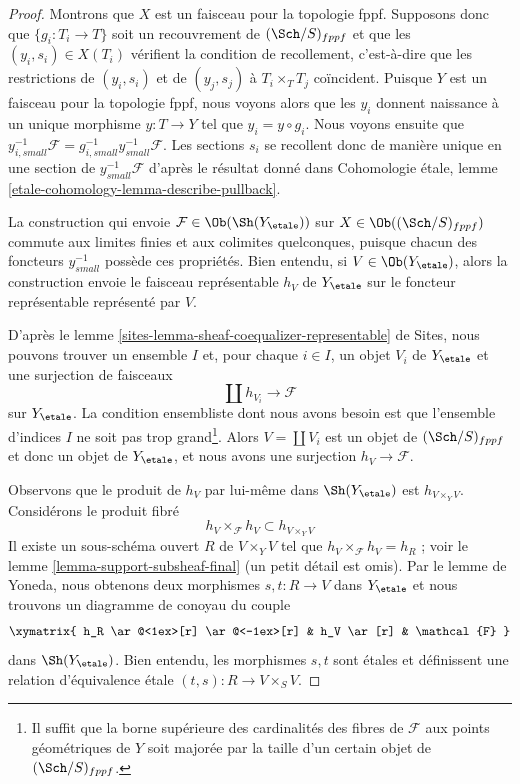 \begin{proof}
Montrons que $X$ est un faisceau pour la topologie fppf. Supposons donc
que $\{g_i : T_i \to T\}$ soit un recouvrement de $(\Sch/S)_{fppf}$ et que
les $(y_i, s_i) \in X(T_i)$ vérifient la condition de recollement, c'est-à-dire que les
restrictions de $(y_i, s_i)$ et de $(y_j, s_j)$ à $T_i \times_T T_j$ coïncident.
Puisque $Y$ est un faisceau pour la topologie fppf, nous voyons alors que
les $y_i$ donnent naissance à un unique morphisme $y : T \to Y$ tel que
$y_i = y \circ g_i$. Nous voyons ensuite que
$y_{i, small}^{-1}\mathcal{F} = g_{i, small}^{-1}y_{small}^{-1}\mathcal{F}$.
Les sections $s_i$ se recollent donc de manière unique en une section de
$y_{small}^{-1}\mathcal{F}$ d'après le résultat donné dans
Cohomologie \'etale, lemme \ref{etale-cohomology-lemma-describe-pullback}.

\medskip\noindent
La construction qui envoie $\mathcal{F} \in \Ob(\Sh(Y_\etale))$
sur $X \in \Ob((\Sch/S)_{fppf})$ commute aux limites finies et
aux colimites quelconques, puisque chacun des foncteurs $y_{small}^{-1}$ possède
ces propriétés. Bien entendu, si $V \in \Ob(Y_\etale)$, alors
la construction envoie le faisceau représentable $h_V$ de $Y_\etale$
sur le foncteur représentable représenté par $V$.

\medskip\noindent
D'après le lemme \ref{sites-lemma-sheaf-coequalizer-representable} de Sites,
nous pouvons trouver un ensemble $I$ et, pour chaque $i \in I$, un objet $V_i$ de $Y_\etale$
et une surjection de faisceaux
$$
\coprod h_{V_i} \longrightarrow \mathcal{F}
$$
sur $Y_\etale$. La condition ensembliste dont nous avons besoin est que l'ensemble
d'indices $I$ ne soit pas trop grand\footnote{Il suffit que la borne supérieure des
cardinalités des fibres de $\mathcal{F}$ aux points géométriques de $Y$
soit majorée par la taille d'un certain objet de $(\Sch/S)_{fppf}$.}.
Alors $V = \coprod V_i$ est un objet de $(\Sch/S)_{fppf}$ et
donc un objet de $Y_\etale$, et nous avons une surjection
$h_V \to \mathcal{F}$.

\medskip\noindent
Observons que le produit de $h_V$ par lui-même dans $\Sh(Y_\etale)$
est $h_{V \times_Y V}$. Considérons le produit fibré
$$
h_V \times_\mathcal{F} h_V \subset h_{V \times_Y V}
$$
Il existe un sous-schéma ouvert $R$ de $V \times_Y V$ tel que
$h_V \times_\mathcal{F} h_V = h_R$ ; voir le
lemme \ref{lemma-support-subsheaf-final} (un petit détail est omis).
Par le lemme de Yoneda, nous obtenons deux morphismes $s, t : R \to V$ dans $Y_\etale$
et nous trouvons un diagramme de conoyau du couple
$$
\xymatrix{
h_R \ar@<1ex>[r] \ar@<-1ex>[r] &
h_V \ar[r] &
\mathcal{F}
}
$$
dans $\Sh(Y_\etale)$. Bien entendu, les morphismes $s, t$ sont \'etales
et définissent une relation d'équivalence \'etale $(t, s) : R \to V \times_S V$.


\end{proof}
